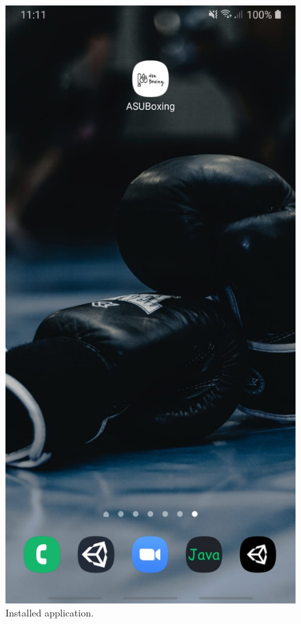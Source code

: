 \documentclass[a4paper,12pt]{report}
\begin{document}
\begin{figure}[ht] 
  \label{ fig7} 
  \begin{minipage}[b]{0.5\linewidth}
    \centering
    \includegraphics[width=.7\linewidth]{images/aplicationImages/application.jpeg} 
    \caption{Installed application.} 
    \vspace{4ex}
  \end{minipage}%
  \begin{minipage}[b]{0.5\linewidth}
    \centering

\end{minipage}
\end{figure}
\end{document}
